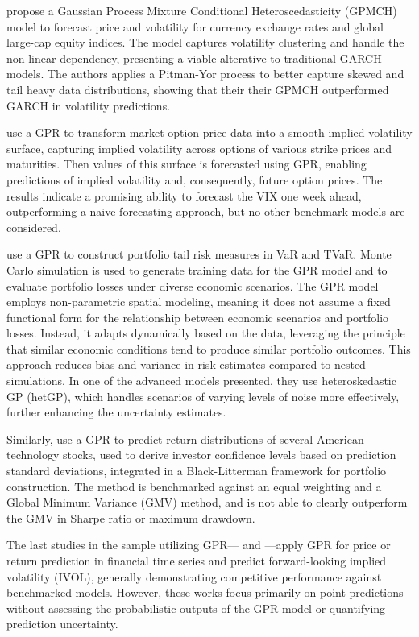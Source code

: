 \textcite{Platanios2014gpr} propose a Gaussian Process Mixture Conditional Heteroscedasticity (GPMCH) model to forecast price and volatility for currency exchange rates and global large-cap equity indices. The model captures volatility clustering and handle the non-linear dependency, presenting a viable alterative to traditional GARCH models. The authors applies a Pitman-Yor process to better capture skewed and tail heavy data distributions, showing that their their GPMCH outperformed GARCH in volatility predictions.

\textcite{tegner2021probabilistic} use a GPR to transform market option price data into a smooth implied volatility surface, capturing implied volatility across options of various strike prices and maturities. Then values of this surface is forecasted using GPR, enabling predictions of implied volatility and, consequently, future option prices. The results indicate a promising ability to forecast the VIX one week ahead, outperforming a naive forecasting approach, but no other benchmark models are considered.

\textcite{Risk2018gpr} use a GPR to construct portfolio tail risk measures in VaR and TVaR. Monte Carlo simulation is used to generate training data for the GPR model and to evaluate portfolio losses under diverse economic scenarios. The GPR model employs non-parametric spatial modeling, meaning it does not assume a fixed functional form for the relationship between economic scenarios and portfolio losses. Instead, it adapts dynamically based on the data, leveraging the principle that similar economic conditions tend to produce similar portfolio outcomes. This approach reduces bias and variance in risk estimates compared to nested simulations. In one of the advanced models presented, they use heteroskedastic GP (hetGP), which handles scenarios of varying levels of noise more effectively, further enhancing the uncertainty estimates. 

Similarly, \textcite{Min2023BlackLitterman} use a GPR to predict return distributions of several American technology stocks, used to derive investor confidence levels based on prediction standard deviations, integrated in a Black-Litterman framework for portfolio construction. The method is benchmarked against an equal weighting and a Global Minimum Variance (GMV) method, and is not able to clearly outperform the GMV in Sharpe ratio or maximum drawdown. 

The last studies in the sample utilizing GPR—\textcite{Papaioannou2022gpr, Zmuk2020gpr, Park2014gpr, Hendawy2023} and \textcite{DeSpiegeleer2018gpr}—apply GPR for price or return prediction in financial time series and \textcite{Hocht2024gpr} predict forward-looking implied volatility (IVOL), generally demonstrating competitive performance against benchmarked models. However, these works focus primarily on point predictions without assessing the probabilistic outputs of the GPR model or quantifying prediction uncertainty.




